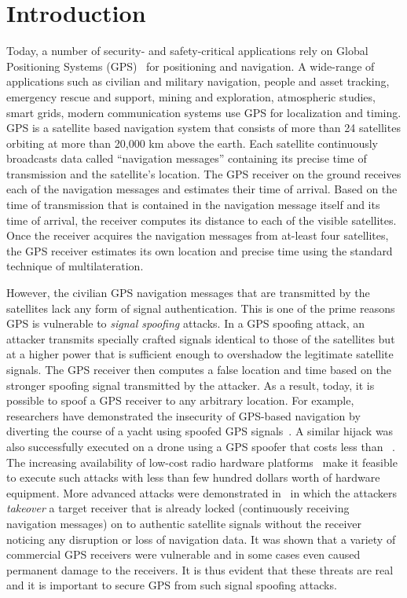 \documentclass[letterpaper,twocolumn,10pt]{article}
\begin{document}
  
\section{Introduction}
Today, a number of security- and safety-critical applications rely on Global Positioning Systems (GPS)~\cite{misra2006global} for positioning and navigation. A wide-range of applications such as civilian and military navigation, people and asset tracking, emergency rescue and support, mining and exploration, atmospheric studies, smart grids, modern communication systems use GPS for localization and timing. GPS is a satellite based navigation system that consists of more than 24 satellites orbiting at more than 20,000 km above the earth. Each satellite continuously broadcasts data called ``navigation messages'' containing its precise time of transmission and the satellite’s location. The GPS receiver on the ground receives each of the navigation messages and estimates their time of arrival.  Based on the time of transmission that is contained in the navigation message itself and its time of arrival, the receiver computes its distance to each of the visible satellites. Once the receiver acquires the navigation messages from at-least four satellites, the GPS receiver estimates its own location and precise time using the standard technique of multilateration.

However, the civilian GPS navigation messages that are transmitted by the satellites lack any form of signal authentication. This is one of the prime
reasons GPS is vulnerable to \emph{signal spoofing} attacks. In a GPS
spoofing attack, an attacker transmits specially crafted signals identical to
those of the satellites but at a higher power that is sufficient enough to overshadow the legitimate satellite signals. The GPS receiver then computes a false location and time based on the stronger spoofing signal transmitted by the attacker. As a result, today, it is possible to spoof a GPS receiver to any arbitrary location. For example, researchers have demonstrated the insecurity of GPS-based navigation by diverting the course of a yacht using spoofed GPS signals~\cite{yacht_spoofing}. A similar hijack was also successfully executed on a drone using a GPS spoofer that costs less than ~\cite{lowcost_gps}. The increasing availability of low-cost radio hardware platforms~\cite{ettus_research} make it feasible to execute such attacks with less than few hundred dollars worth of hardware equipment. More advanced attacks were demonstrated in~\cite{NighswanderCCS2012,Tippenhauer2011} in which the attackers \textit{takeover} a target receiver that is already locked (continuously receiving navigation messages) on to authentic satellite signals without the receiver noticing any disruption or loss of navigation data. It was shown that a variety of commercial GPS receivers were vulnerable and in some cases even caused permanent damage to the receivers. It is thus evident that these threats are real and it is important to secure GPS from such signal spoofing attacks.
\end{document}
